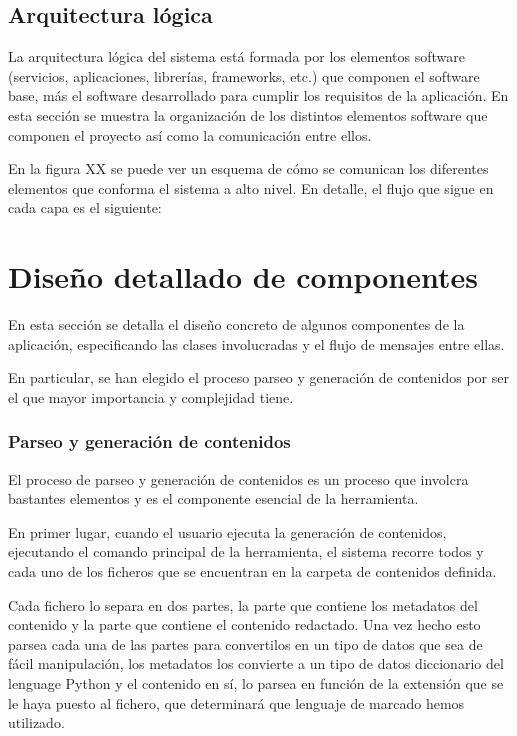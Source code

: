 \subsection{Arquitectura lógica}

La arquitectura lógica del sistema está formada por los elementos software
(servicios, aplicaciones, librerías, frameworks, etc.) que componen el software base,
más el software desarrollado para cumplir los requisitos de la aplicación. En esta
sección se muestra la organización de los distintos elementos software que 
componen el proyecto así como la comunicación entre ellos.

En la figura XX se puede ver un esquema de cómo se comunican los diferentes
elementos que conforma el sistema a alto nivel. En detalle, el flujo que sigue
en cada capa es el siguiente:


\section{Diseño detallado de componentes}

En esta sección se detalla el diseño concreto de algunos componentes de la aplicación, 
especificando las clases involucradas y el flujo de mensajes entre ellas.

En particular, se han elegido el proceso parseo y generación de contenidos
por ser el que mayor importancia y complejidad tiene.

\subsubsection{Parseo y generación de contenidos}

El proceso de parseo y generación de contenidos es un proceso que involcra bastantes
elementos y es el componente esencial de la herramienta.

En primer lugar, cuando el usuario ejecuta la generación de contenidos, ejecutando el comando
principal de la herramienta, el sistema recorre todos y cada uno de los ficheros que se encuentran
en la carpeta de contenidos definida.

Cada fichero lo separa en dos partes, la parte que contiene los metadatos del contenido y la parte que
contiene el contenido redactado. Una vez hecho esto parsea cada una de las partes para convertilos en 
un tipo de datos que sea de fácil manipulación, los metadatos los convierte a un tipo de datos
diccionario del lenguage Python y el contenido en sí, lo parsea en función de la extensión que se le
haya puesto al fichero, que determinará que lenguaje de marcado hemos utilizado.

